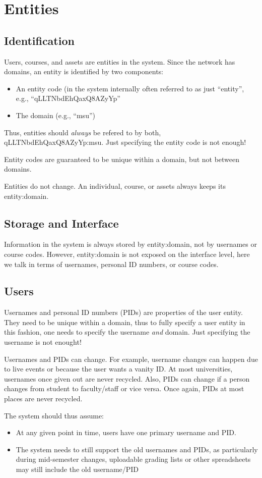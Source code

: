 \chapter{Entities}
\section{Identification}\label{entities}
Users, courses, and assets are entities in the system. Since the network has domains, an entity is identified by two components:
\begin{itemize}
\item An entity code (in the system internally often referred to as just ``entity'', e.g., ``qLLTNbdEhQaxQ8AZyYp''
\item The domain (e.g., ``msu'')
\end{itemize}
Thus, entities should {\it always} be refered to by both, qLLTNbdEhQaxQ8AZyYp:msu. Just specifying the entity code is not enough!

Entity codes are guaranteed to be unique within a domain, but not between domains.

Entities do not change. An individual, course, or assets always keeps its entity:domain.
\section{Storage and Interface}
Information in the system is always stored by entity:domain, not by usernames or course codes. However, entity:domain is not exposed on the interface level, here we talk in terms of usernames, personal ID numbers, or course codes.
\section{Users}
Usernames and personal ID numbers (PIDs) are properties of the user entity. They need to be unique within a domain, thus to fully specify a user entity in this fashion, one needs to specify the username {\it and} domain. Just specifying the username is not enought!

Usernames and PIDs can change. For example, username changes can happen due to live events or because the user wants a vanity ID. At most universities, usernames once given out are never recycled. Also, PIDs can change if a person changes from student to faculty/staff or vice versa. Once again, PIDs at most places are never recycled.

The system should thus assume:
\begin{itemize}
\item At any given point in time, users have one primary username and PID.
\item The system needs to still support the old usernames and PIDs, as particularly during mid-semester changes, uploadable grading lists or other spreadsheets may still include the old username/PID
\end{itemize}

